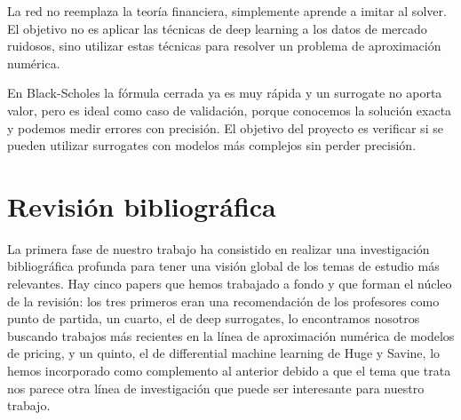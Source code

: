 \documentclass[11pt,a4paper]{article}
\begin{document}
\begin{center}
\end{center}

La red no reemplaza la teoría financiera, simplemente aprende a imitar al solver. El objetivo no es aplicar las técnicas de deep learning a los datos de mercado ruidosos, sino utilizar estas técnicas para resolver un problema de aproximación numérica.

En Black-Scholes la fórmula cerrada ya es muy rápida y un surrogate no aporta valor, pero es ideal como caso de validación, porque conocemos la solución exacta y podemos medir errores con precisión. El objetivo del proyecto es verificar si se pueden utilizar surrogates con modelos más complejos sin perder precisión.

\section{Revisión bibliográfica}

La primera fase de nuestro trabajo ha consistido en realizar una investigación bibliográfica profunda para tener una visión global de los temas de estudio más relevantes. Hay cinco papers que hemos trabajado a fondo y que forman el núcleo de la revisión: los tres primeros eran una recomendación de los profesores como punto de partida, un cuarto, el de deep surrogates, lo encontramos nosotros buscando trabajos más recientes en la línea de aproximación numérica de modelos de pricing, y un quinto, el de differential machine learning de Huge y Savine, lo hemos incorporado como complemento al anterior debido a que el tema que trata nos parece otra línea de investigación que puede ser interesante para nuestro trabajo.
\end{document}
